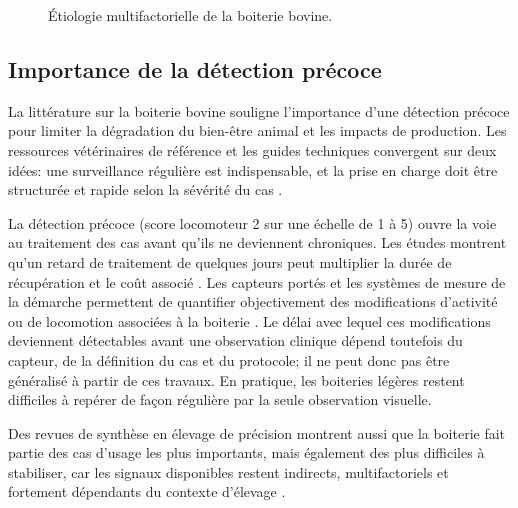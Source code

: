 \begin{figure}[H]
{%
    }
    \caption{Étiologie multifactorielle de la boiterie bovine.}
    \label{fig:etiologie}
\end{figure}

\subsection{Importance de la détection précoce}
La littérature sur la boiterie bovine souligne l'importance d'une détection précoce pour
limiter la dégradation du bien-être animal et les impacts de production. Les ressources
vétérinaires de référence et les guides techniques convergent sur deux idées:
une surveillance régulière est indispensable, et la prise en charge doit être
structurée et rapide selon la sévérité du cas
\citep{merck_lameness_overview,dairynz_treating_lameness}.

La détection précoce (score locomoteur 2 sur une échelle de 1 à 5) ouvre la voie au
traitement des cas avant qu'ils ne deviennent chroniques. Les études montrent qu'un
retard de traitement de quelques jours peut multiplier la durée de récupération et le
coût associé \citep{green2002financial}. Les capteurs portés et les systèmes de mesure de
la démarche permettent de quantifier objectivement des modifications d'activité ou de
locomotion associées à la boiterie
\citep{chapinal2010measurement,pastell2009measurement}. Le délai avec lequel ces
modifications deviennent détectables avant une observation clinique dépend toutefois du
capteur, de la définition du cas et du protocole; il ne peut donc pas être généralisé à
partir de ces travaux. En pratique, les boiteries légères restent difficiles à repérer de
façon régulière par la seule observation visuelle.

Des revues de synthèse en élevage de précision montrent aussi que la boiterie fait partie
des cas d'usage les plus importants, mais également des plus difficiles à stabiliser, car
les signaux disponibles restent indirects, multifactoriels et fortement dépendants du
contexte d'élevage \citep{palma2025scoping,michelena2025plf_review}.

